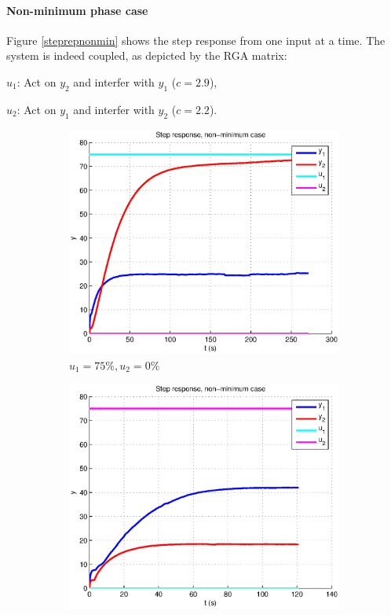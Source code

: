 \paragraph{Non-minimum phase case} 

Figure \ref{steprepnonmin} shows the step response from one input at a time.
The system is indeed coupled, as depicted by the RGA matrix:
\begin{shortitemize}
    \item $u_1$: Act on $y_2$ and interfer with $y_1$ ($c=2.9$),
    \item $u_2$: Act on $y_1$ and interfer with $y_2$ ($c=2.2$).
\end{shortitemize}

\begin{figure}[h!t]
        \centering
        \begin{subfigure}[b]{0.45\columnwidth}
                \includegraphics[width=\columnwidth]{fig/steprepnonmin0_75.eps}
                \caption{$u_1 = 75\%, u_2 = 0\%$}
        \end{subfigure}
        \begin{subfigure}[b]{0.45\columnwidth}
                \includegraphics[width=\columnwidth]{fig/steprepnonmin75_0.eps}

\end{subfigure}
\end{figure}
